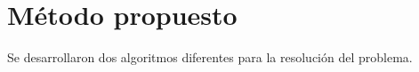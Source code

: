 \documentclass[conference,spanish,a4paper,10pt,oneside,final]{tfmpd}
\begin{document}
\section{Método propuesto}
Se desarrollaron dos algoritmos diferentes para la resolución del problema.
%
%
%
%
%
%
\end{document}
